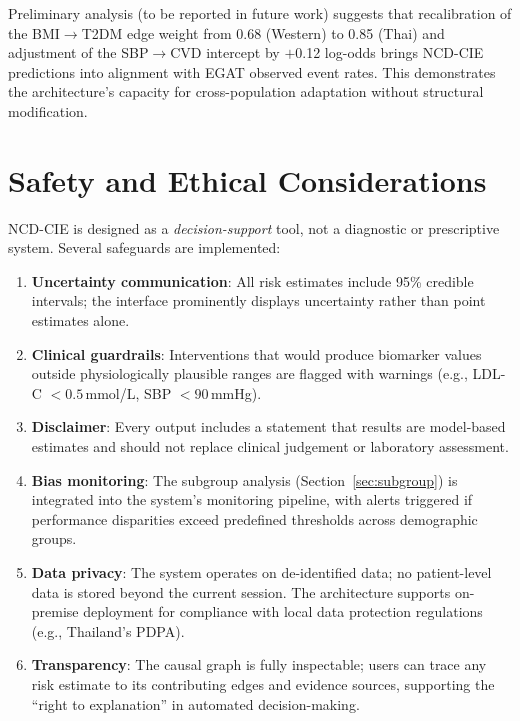 \documentclass[runningheads]{llncs}
\begin{document}
Preliminary analysis (to be reported in future work) suggests that
recalibration of the BMI$\rightarrow$T2DM edge weight from 0.68
(Western) to 0.85 (Thai) and adjustment of the SBP$\rightarrow$CVD
intercept by $+$0.12 log-odds brings NCD-CIE predictions into
alignment with EGAT observed event rates.  This demonstrates the
architecture's capacity for cross-population adaptation without
structural modification.

\section{Safety and Ethical Considerations}\label{sec:ethics}

NCD-CIE is designed as a \emph{decision-support} tool, not a
diagnostic or prescriptive system.  Several safeguards are
implemented:

\begin{enumerate}
\item \textbf{Uncertainty communication}: All risk estimates include
  95\% credible intervals; the interface prominently displays
  uncertainty rather than point estimates alone.
\item \textbf{Clinical guardrails}: Interventions that would produce
  biomarker values outside physiologically plausible ranges are
  flagged with warnings (e.g., LDL-C $< 0.5$\,mmol/L, SBP
  $< 90$\,mmHg).
\item \textbf{Disclaimer}: Every output includes a statement that
  results are model-based estimates and should not replace clinical
  judgement or laboratory assessment.
\item \textbf{Bias monitoring}: The subgroup analysis
  (Section~\ref{sec:subgroup}) is integrated into the system's
  monitoring pipeline, with alerts triggered if performance
  disparities exceed predefined thresholds across demographic groups.
\item \textbf{Data privacy}: The system operates on de-identified
  data; no patient-level data is stored beyond the current session.
  The architecture supports on-premise deployment for compliance with
  local data protection regulations (e.g., Thailand's PDPA).
\item \textbf{Transparency}: The causal graph is fully inspectable;
  users can trace any risk estimate to its contributing edges and
  evidence sources, supporting the ``right to explanation'' in
  automated decision-making.
\end{enumerate}
\end{document}

